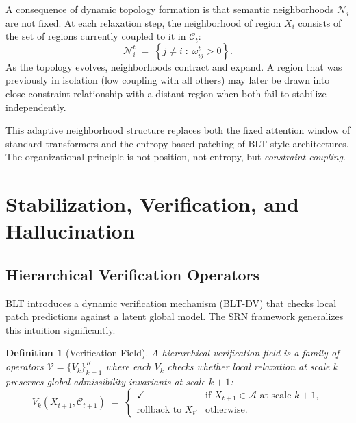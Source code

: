 \documentclass[11pt, a4paper]{article}
\theoremstyle{srn}
\newtheorem{definition}{Definition}[section]
\theoremstyle{srnremark}
\newcommand{\Aspace}{\mathcal{A}}           %
\newcommand{\Cstruct}{\mathcal{C}}           %
\newcommand{\Nhd}{\mathcal{N}}           %
\begin{document}
A consequence of dynamic topology formation is that semantic
neighborhoods $\Nhd_i$ are not fixed.
At each relaxation step, the neighborhood of region $X_i$ consists of
the set of regions currently coupled to it in $\Cstruct_t$:
\[
  \Nhd_i^t \;=\; \left\{ j \neq i \;:\; \omega_{ij}^t > 0 \right\}.
\]
As the topology evolves, neighborhoods contract and expand.
A region that was previously in isolation (low coupling with all
others) may later be drawn into close constraint relationship with a
distant region when both fail to stabilize independently.

This adaptive neighborhood structure replaces both the fixed attention
window of standard transformers and the entropy-based patching of
BLT-style architectures.
The organizational principle is not position, not entropy, but
\emph{constraint coupling}.

\section{Stabilization, Verification, and Hallucination}
\label{sec:verification}

\subsection{Hierarchical Verification Operators}

BLT introduces a dynamic verification mechanism (BLT-DV) that checks
local patch predictions against a latent global model.
The SRN framework generalizes this intuition significantly.

\begin{definition}[Verification Field]
\label{def:verification}
A \emph{hierarchical verification field} is a family of operators
$\mathcal{V} = \{ V_k \}_{k=1}^K$ where each $V_k$ checks whether
local relaxation at scale $k$ preserves global admissibility
invariants at scale $k+1$:
\[
  V_k(X_{t+1}, \Cstruct_{t+1}) \;=\;
  \begin{cases}
    \checkmark & \text{if } X_{t+1} \in \Aspace \text{ at scale } k+1, \\
    \text{rollback to } X_{t'} & \text{otherwise}.
  \end{cases}
\]
\end{definition}
\end{document}
